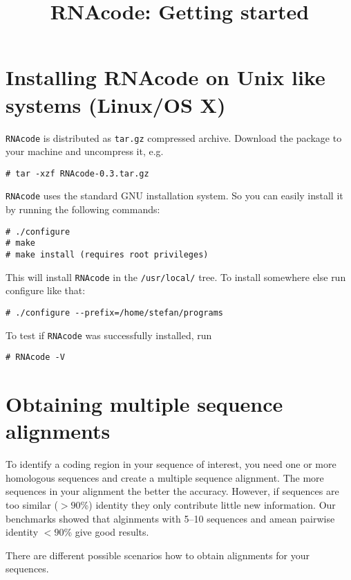 \documentclass{article}
\begin{document}
\title{RNAcode: Getting started}
\maketitle

\section{Installing RNAcode on Unix like systems (Linux/OS X)}

\texttt{RNAcode} is distributed as \texttt{tar.gz} compressed
archive. Download the package to your machine and uncompress it, e.g.

\begin{verbatim}
# tar -xzf RNAcode-0.3.tar.gz
\end{verbatim}

\texttt{RNAcode} uses the standard GNU installation system. So you can easily
install it by running the following commands:

\begin{verbatim}
# ./configure
# make
# make install (requires root privileges)
\end{verbatim}

This will install \texttt{RNAcode} in the \texttt{/usr/local/} tree. To install
somewhere else run configure like that:

\begin{verbatim}
# ./configure --prefix=/home/stefan/programs
\end{verbatim}

To test if \texttt{RNAcode} was successfully installed, run 

\begin{verbatim}
# RNAcode -V
\end{verbatim}

\section{Obtaining multiple sequence alignments}

To identify a coding region in your sequence of interest, you need one
or more homologous sequences and create a multiple sequence
alignment. The more sequences in your alignment the better the
accuracy. However, if sequences are too similar ($>90$\%) identity
they only contribute little new information. Our benchmarks showed
that alginments with 5--10 sequences and amean pairwise identity
$<90$\% give good results.

There are different possible scenarios how to obtain alignments for
your sequences.
\end{document}
